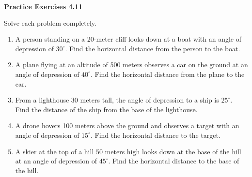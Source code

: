 \vspace{0.3ex}
\noindent\textbf{Practice Exercises 4.11}

\vspace{0.2ex}

Solve each problem completely.

\begin{enumerate}
    \item A person standing on a 20-meter cliff looks down at a boat with an angle of depression of \(30^\circ\). Find the horizontal distance from the person to the boat.
    \item A plane flying at an altitude of 500 meters observes a car on the ground at an angle of depression of \(40^\circ\). Find the horizontal distance from the plane to the car.
    \item From a lighthouse 30 meters tall, the angle of depression to a ship is \(25^\circ\). Find the distance of the ship from the base of the lighthouse.
    \item A drone hovers 100 meters above the ground and observes a target with an angle of depression of \(15^\circ\). Find the horizontal distance to the target.
   \item A skier at the top of a hill 50 meters high looks down at the base of the hill at an angle of depression of \(45^\circ\). Find the horizontal distance to the base of the hill.
\end{enumerate}
